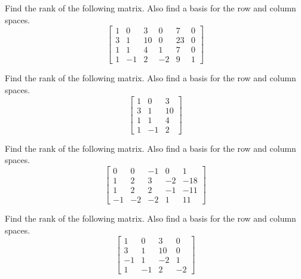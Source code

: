 \documentclass{ximera}
\begin{document}
\begin{problem}\label{prb:5.34} Find the rank of the following matrix. Also find a basis for the row
and column spaces.
\begin{equation*}
\left[
\begin{array}{rrrrrr}
1 & 0 & 3 & 0 & 7 & 0 \\
3 & 1 & 10 & 0 & 23 & 0 \\
1 & 1 & 4 & 1 & 7 & 0 \\
1 & -1 & 2 & -2 & 9 & 1
\end{array}
\right]
\end{equation*}
\end{problem}

\begin{problem}\label{prb:5.35} Find the rank of the following matrix. Also find a basis for the row
and column spaces.
\begin{equation*}
\left[
\begin{array}{rrr}
1 & 0 & 3 \\
3 & 1 & 10 \\
1 & 1 & 4 \\
1 & -1 & 2
\end{array}
\right]
\end{equation*}
\end{problem}

\begin{problem}\label{prb:5.36} Find the rank of the following matrix. Also find a basis for the row
and column spaces.
\begin{equation*}
\left[
\begin{array}{rrrrr}
0 & 0 & -1 & 0 & 1 \\
1 & 2 & 3 & -2 & -18 \\
1 & 2 & 2 & -1 & -11 \\
-1 & -2 & -2 & 1 & 11
\end{array}
\right]
\end{equation*}
\end{problem}

\begin{problem}\label{prb:5.37} Find the rank of the following matrix. Also find a basis for the row
and column spaces.
\begin{equation*}
\left[
\begin{array}{rrrr}
1 & 0 & 3 & 0 \\
3 & 1 & 10 & 0 \\
-1 & 1 & -2 & 1 \\
1 & -1 & 2 & -2
\end{array}
\right]
\end{equation*}
\end{problem}
\end{document}
